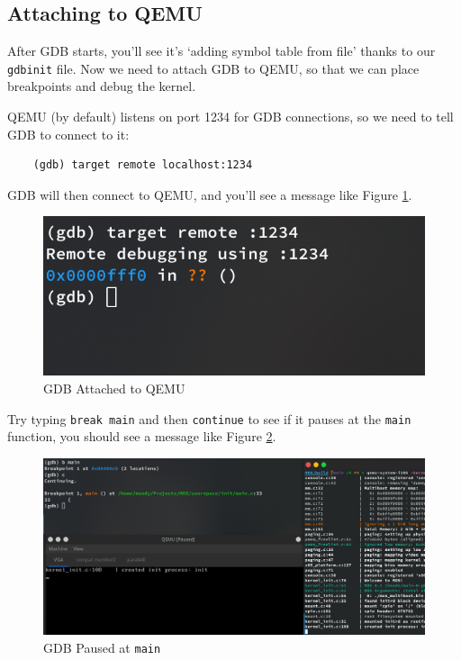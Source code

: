 \subsection{Attaching to QEMU} \label{sec:gdb-attach}

After GDB starts, you'll see it's `adding symbol table from file' thanks to our \texttt{gdbinit} file.
Now we need to attach GDB to QEMU, so that we can place breakpoints and debug the kernel.

QEMU (by default) listens on port 1234 for GDB connections, so we need to tell GDB to connect to it:

\begin{verbatim}
    (gdb) target remote localhost:1234
\end{verbatim}

GDB will then connect to QEMU, and you'll see a message like Figure \ref{fig:gdb-attached}.

\begin{figure}[ht]
    \centering
    \includegraphics[width=\textwidth]{assets/c1.gdb-attached.png}
    \caption{GDB Attached to QEMU}
    \label{fig:gdb-attached}
\end{figure}

Try typing \texttt{break main} and then \texttt{continue} to see if it pauses at the \texttt{main}
function, you should see a message like Figure \ref{fig:gdb-paused}.

\begin{figure}[ht]
    \centering
    \includegraphics[width=\textwidth]{assets/c1.gdb-paused.png}
    \caption{GDB Paused at \texttt{main}}
    \label{fig:gdb-paused}
\end{figure}

